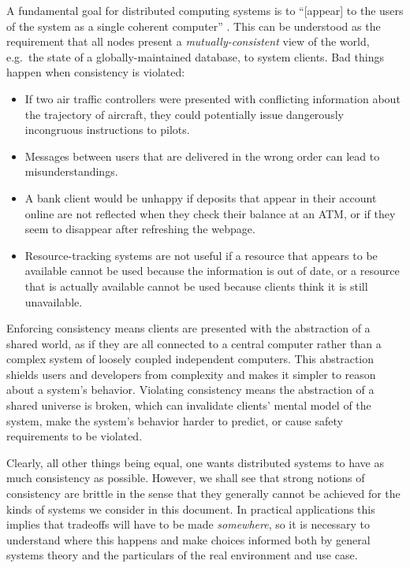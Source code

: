 \documentclass[]             %
{NASA}                       %
\theoremstyle{definition}
\begin{document}
A fundamental goal for distributed computing systems is to
``{[}appear{]} to the users of the system as a single coherent
computer'' \cite{TanenbaumSteen07}. This can be understood as the
requirement that all nodes present a \emph{mutually-consistent} view of
the world, e.g.~the state of a globally-maintained database, to system
clients. Bad things happen when consistency is violated:

\begin{itemize}
\item
  If two air traffic controllers were presented with conflicting
  information about the trajectory of aircraft, they could potentially
  issue dangerously incongruous instructions to pilots.
\item
  Messages between users that are delivered in the wrong order can lead
  to misunderstandings.
\item
  A bank client would be unhappy if deposits that appear in their
  account online are not reflected when they check their balance at an
  ATM, or if they seem to disappear after refreshing the webpage.
\item
  Resource-tracking systems are not useful if a resource that appears to
  be available cannot be used because the information is out of date, or
  a resource that is actually available cannot be used because clients
  think it is still unavailable.
\end{itemize}

Enforcing consistency means clients are presented with the abstraction
of a shared world, as if they are all connected to a central computer
rather than a complex system of loosely coupled independent computers.
This abstraction shields users and developers from complexity and makes
it simpler to reason about a system's behavior. Violating consistency
means the abstraction of a shared universe is broken, which can
invalidate clients' mental model of the system, make the system's
behavior harder to predict, or cause safety requirements to be violated.

Clearly, all other things being equal, one wants distributed systems to
have as much consistency as possible. However, we shall see that strong
notions of consistency are brittle in the sense that they generally
cannot be achieved for the kinds of systems we consider in this
document. In practical applications this implies that tradeoffs will
have to be made \emph{somewhere}, so it is necessary to understand where
this happens and make choices informed both by general systems theory
and the particulars of the real environment and use case.
\end{document}
